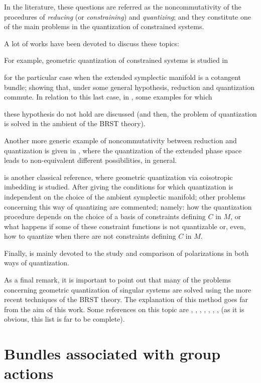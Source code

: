\documentclass[12pt]{article}
\theoremstyle{plain}
\begin{document}
In the literature, these questions are referred as the
noncommutativity of the procedures of
{\it reducing} (or {\it constraining}) and {\it quantizing};
and they constitute one of the main problems in the quantization of
constrained systems.

A lot of works have been devoted to discuss these topics:

For example, geometric quantization of constrained systems is studied in

\cite{Go-86}
for the particular case when the extended symplectic manifold
is a cotangent bundle;
showing that, under some general hypothesis, reduction and quantization
commute.
In relation to this last case, in \cite{DET-90}, some examples for which

these
hypothesis do not hold are discussed (and then, the problem
of quantization is solved in the ambient of the BRST theory).

Another more generic example of noncommutativity between reduction and
quantization
is given in \cite{Lo-90}, where the quantization of the extended phase
space
leads to non-equivalent different possibilities, in general.

\cite{GS-81} is another classical reference, where geometric
quantization via
coisotropic imbedding is studied. After giving the conditions for which
quantization is independent on the choice of the ambient symplectic
manifold;
other problems concerning this way of quantizing are commented;
namely: how the quantization procedure depends on the choice of a basis
of constraints
defining $C$ in $M$, or what happens if some of these constraint
functions is not quantizable or, even, how to quantize when there are
not
constraints defining $C$ in $M$.

Finally, \cite{AS-86} is mainly devoted to the study and comparison of
polarizations in both ways of quantization.

As a final remark, it is important to point out that many of the
problems concerning geometric quantization of singular systems
are solved using the more recent techniques of the
BRST theory. The explanation of this method goes far from the aim
of this work. Some references on this topic are
\cite{ALN-90}, \cite{ALN-91}, \cite{DEGST-91}, \cite{Ib-90},
\cite{Ko-77}, \cite{Lo-92},
\cite{Tu-92a}, \cite{Tu-92b} (as it is obvious, this list is far to be
complete).




\appendix


\section{Bundles associated with group actions}
\end{document}
